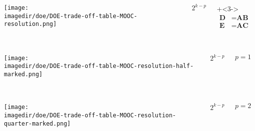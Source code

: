 \begin{frame}\frametitle{}
	\begin{columns}[T]
			\texttt{[image: \\imagedir/doe/DOE-trade-off-table-MOOC-resolution.png]}
		
			
			
				\vspace{2cm}
				{\Huge
					$2^{k-p}$
				} 
			 
				\vspace{2cm}
				\onslide+<3->{ 
					\begin{align*}
						\textbf{D} &= \textbf{AB}\\
						\textbf{E}\, &= \textbf{AC} 
					\end{align*}
				}
	\end{columns}
	
\end{frame}

\begin{frame}\frametitle{}
	\begin{columns}[T]
			\texttt{[image: \\imagedir/doe/DOE-trade-off-table-MOOC-resolution-half-marked.png]}
		
			
			
				\vspace{2cm}
				{\Huge
					$2^{k-p}$\\
					
					\vspace{1cm}
					
				} $p=1$
			 
				
	\end{columns}
	
\end{frame}

\begin{frame}\frametitle{}
	\begin{columns}[T]
			\texttt{[image: \\imagedir/doe/DOE-trade-off-table-MOOC-resolution-quarter-marked.png]}
		
			
			
				\vspace{2cm}
				{\Huge
					$2^{k-p}$\\
					
					\vspace{1cm}
					
				} $p=2$
			 
				
	\end{columns}
	
\end{frame}

